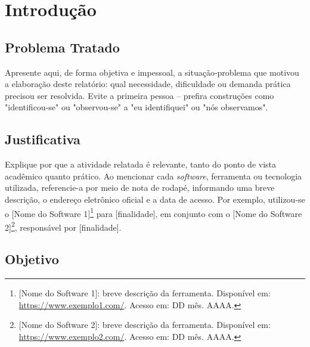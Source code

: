 \documentclass[
    12pt,
    openright,
    oneside,
    a4paper,
    brazil
]{abntex2}
\renewcommand{\lstlistlistingname}{Lista de Listagens}
\begin{document}
\pdfbookmark[0]{\lstlistlistingname}{lol}
\lstlistoflistings
\cleardoublepage

\tableofcontents*
\cleardoublepage

\textual

\chapter{Introdução}

\section{Problema Tratado}

Apresente aqui, de forma objetiva e impessoal, a situação-problema que motivou a elaboração deste relatório: qual necessidade, dificuldade ou demanda prática precisou ser resolvida. Evite a primeira pessoa -- prefira construções como "identificou-se" ou "observou-se" a "eu identifiquei" ou "nós observamos".

\section{Justificativa}

Explique por que a atividade relatada é relevante, tanto do ponto de vista acadêmico quanto prático. Ao mencionar cada \textit{software}, ferramenta ou tecnologia utilizada, referencie-a por meio de nota de rodapé, informando uma breve descrição, o endereço eletrônico oficial e a data de acesso. Por exemplo, utilizou-se o [Nome do Software 1]\footnote{[Nome do Software 1]: breve descrição da ferramenta. Disponível em: \url{https://www.exemplo1.com/}. Acesso em: DD mês. AAAA.} para [finalidade], em conjunto com o [Nome do Software 2]\footnote{[Nome do Software 2]: breve descrição da ferramenta. Disponível em: \url{https://www.exemplo2.com/}. Acesso em: DD mês. AAAA.}, responsável por [finalidade].

\section{Objetivo}
\end{document}
